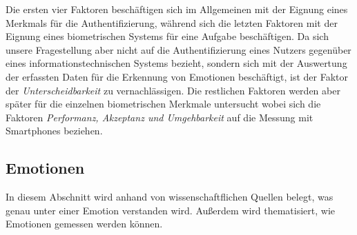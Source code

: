 Die ersten vier Faktoren beschäftigen sich im Allgemeinen mit der Eignung eines Merkmals für die Authentifizierung, während sich die letzten Faktoren mit der Eignung eines biometrischen Systems für eine Aufgabe beschäftigen. Da sich unsere Fragestellung aber nicht auf die Authentifizierung eines Nutzers gegenüber eines informationstechnischen Systems bezieht, sondern sich mit der Auswertung der erfassten Daten für die Erkennung von Emotionen beschäftigt, ist der Faktor der \textit{Unterscheidbarkeit} zu vernachlässigen. Die restlichen Faktoren werden aber später für die einzelnen biometrischen Merkmale untersucht wobei sich die Faktoren \textit{Performanz, Akzeptanz und Umgehbarkeit} auf die Messung mit Smartphones beziehen.
\subsection{Emotionen}
In diesem Abschnitt wird anhand von wissenschaftflichen Quellen belegt, was genau unter einer Emotion verstanden wird. Außerdem wird thematisiert, wie Emotionen gemessen werden können.

